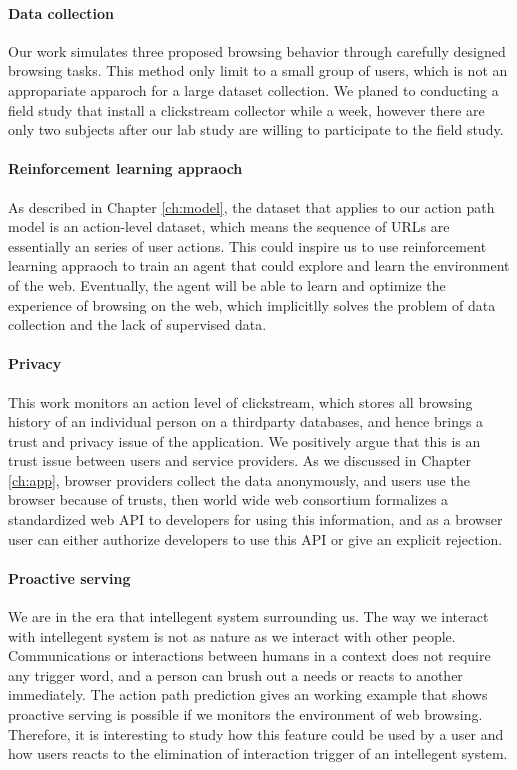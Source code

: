 \paragraph{Data collection}
Our work simulates three proposed browsing behavior through carefully designed browsing tasks.
This method only limit to a small group of users, which is not an appropariate apparoch for
a large dataset collection.
We planed to conducting a field study that install a clickstream collector while a week, 
however there are only two subjects after our lab study
are willing to participate to the field study.

\paragraph{Reinforcement learning appraoch}
As described in Chapter \ref{ch:model}, the dataset that applies to our action path model
is an action-level dataset, which means the sequence of URLs are essentially an series of 
user actions. This could inspire us to use reinforcement learning appraoch to train
an agent that could explore and learn the environment of the web. Eventually,
the agent will be able to learn and optimize the experience of browsing on the web,
which implicitlly solves the problem of data collection and the lack of supervised data.

\paragraph{Privacy}
This work monitors an action level of clickstream, which stores all browsing history of an
individual person on a thirdparty databases, and hence brings a trust and privacy issue of
the application. We positively argue that this is an trust issue between users and service providers.
As we discussed in Chapter \ref{ch:app}, browser providers collect the data anonymously,
and users use the browser because of trusts, then world wide web consortium formalizes
a standardized web API to developers for using this information, and as a browser user can
either authorize developers to use this API or give an explicit rejection.

\paragraph{Proactive serving} 
We are in the era that intellegent system surrounding us. The way we interact with intellegent system
is not as nature as we interact with other people. 
Communications or interactions between humans in a context does not require any trigger word,
and a person can brush out a needs or reacts to another immediately.
The action path prediction gives an working example that shows proactive serving is possible
if we monitors the environment of web browsing. Therefore, it is interesting to study
how this feature could be used by a user and how users reacts to the elimination of interaction trigger
of an intellegent system.

\cleardoublepage